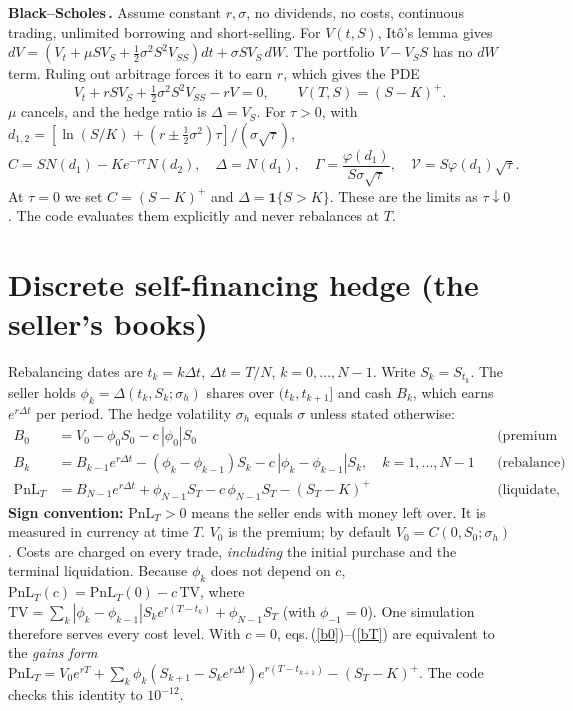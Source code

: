 \documentclass[10pt,a4paper]{article}
\newcommand{\PnL}{\mathrm{PnL}_T}
\begin{document}
\textbf{Black--Scholes\,\cite{bs,merton,shreve}.} Assume constant $r,\sigma$, no dividends, no costs, continuous trading, unlimited borrowing
and short-selling. For $V(t,S)$, It\^o's lemma gives $dV=(V_t+\mu SV_S+\tfrac12\sigma^2S^2V_{SS})dt+\sigma SV_S\,dW$.
The portfolio $V-V_S S$ has no $dW$ term. Ruling out arbitrage forces it to earn $r$, which gives the PDE
\begin{equation}
V_t+rSV_S+\tfrac12\sigma^2S^2V_{SS}-rV=0,\qquad V(T,S)=(S-K)^+ .\label{pde}
\end{equation}
$\mu$ cancels, and the hedge ratio is $\Delta=V_S$. For $\tau>0$, with $d_{1,2}=[\ln(S/K)+(r\pm\tfrac12\sigma^2)\tau]/(\sigma\sqrt\tau)$,
\begin{equation}
C=SN(d_1)-Ke^{-r\tau}N(d_2),\quad \Delta=N(d_1),\quad \Gamma=\frac{\varphi(d_1)}{S\sigma\sqrt\tau},\quad \mathcal V=S\varphi(d_1)\sqrt\tau .\label{bs}
\end{equation}
At $\tau=0$ we set $C=(S-K)^+$ and $\Delta=\mathbf 1\{S>K\}$. These are the limits as $\tau\downarrow0$. The code evaluates them explicitly
and never rebalances at $T$.

\section{Discrete self-financing hedge (the seller's books)}
Rebalancing dates are $t_k=k\Delta t$, $\Delta t=T/N$, $k=0,\dots,N-1$. Write $S_k=S_{t_k}$. The seller holds $\phi_k=\Delta(t_k,S_k;\sigma_h)$ shares over
$(t_k,t_{k+1}]$ and cash $B_k$, which earns $e^{r\Delta t}$ per period. The hedge volatility $\sigma_h$ equals $\sigma$ unless stated otherwise:
\begin{align}
B_0&=V_0-\phi_0S_0-c\,|\phi_0|S_0 && \text{(premium in, initial purchase)}\label{b0}\\
B_k&=B_{k-1}e^{r\Delta t}-(\phi_k-\phi_{k-1})S_k-c\,|\phi_k-\phi_{k-1}|S_k,\quad k=1,\dots,N-1 && \text{(rebalance)}\label{bk}\\
\PnL&=B_{N-1}e^{r\Delta t}+\phi_{N-1}S_T-c\,\phi_{N-1}S_T-(S_T-K)^+ && \text{(liquidate, cash-settle)}\label{bT}
\end{align}
\textbf{Sign convention:} $\PnL>0$ means the seller ends with money left over. It is measured in currency at time $T$.
$V_0$ is the premium; by default $V_0=C(0,S_0;\sigma_h)$. Costs are charged on every trade, \emph{including} the
initial purchase and the terminal liquidation. Because $\phi_k$ does not depend on $c$,
$\PnL(c)=\PnL(0)-c\,\mathrm{TV}$, where $\mathrm{TV}=\sum_k|\phi_k-\phi_{k-1}|S_ke^{r(T-t_k)}+\phi_{N-1}S_T$ (with $\phi_{-1}=0$).
One simulation therefore serves every cost level. With $c=0$, eqs.\,(\ref{b0})--(\ref{bT}) are equivalent to the \emph{gains form}
$\PnL=V_0e^{rT}+\sum_k\phi_k(S_{k+1}-S_ke^{r\Delta t})e^{r(T-t_{k+1})}-(S_T-K)^+$. The code checks this identity to $10^{-12}$.
\end{document}
